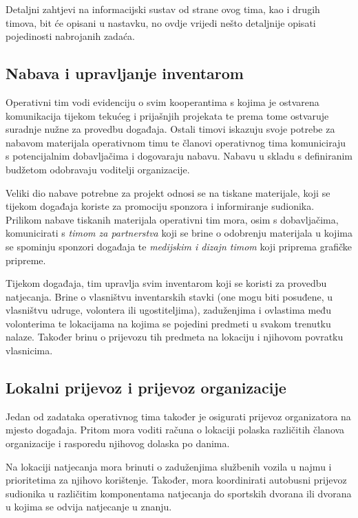 \documentclass[times, utf8, diplomski]{fer}
\begin{document}
Detaljni zahtjevi na informacijski sustav od strane ovog tima, kao i drugih
timova, bit će opisani u nastavku, no ovdje vrijedi nešto detaljnije opisati
pojedinosti nabrojanih zadaća.

\subsection{Nabava i upravljanje inventarom}
Operativni tim vodi evidenciju o svim kooperantima s kojima je ostvarena
komunikacija tijekom tekućeg i prijašnjih projekata te prema tome ostvaruje
suradnje nužne za provedbu događaja. Ostali timovi iskazuju svoje potrebe za
nabavom materijala operativnom timu te članovi operativnog tima komuniciraju s
potencijalnim dobavljačima i dogovaraju nabavu. Nabavu u skladu s definiranim
budžetom odobravaju voditelji organizacije.

Veliki dio nabave potrebne za projekt odnosi se na tiskane materijale, koji se
tijekom događaja koriste za promociju sponzora i informiranje sudionika.
Prilikom nabave tiskanih materijala operativni tim mora, osim s dobavljačima,
komunicirati s \emph{timom za partnerstva} koji se brine o odobrenju materijala u
kojima se spominju sponzori događaja te \emph{medijskim i dizajn timom} koji
priprema grafičke pripreme.

Tijekom događaja, tim upravlja svim inventarom koji se koristi za provedbu
natjecanja. Brine o vlasništvu inventarskih stavki (one mogu biti posuđene, u
vlasništvu udruge, volontera ili ugostiteljima), zaduženjima i ovlastima među
volonterima te lokacijama na kojima se pojedini predmeti u svakom trenutku
nalaze. Također brinu o prijevozu tih predmeta na lokaciju i njihovom povratku
vlasnicima.

\subsection{Lokalni prijevoz i prijevoz organizacije}

Jedan od zadataka operativnog tima također je osigurati prijevoz organizatora na
mjesto događaja. Pritom mora voditi računa o lokaciji polaska različitih članova
organizacije i rasporedu njihovog dolaska po danima.

Na lokaciji natjecanja mora brinuti o zaduženjima službenih vozila u najmu i
prioritetima za njihovo korištenje. Također, mora koordinirati autobusni
prijevoz sudionika u različitim komponentama natjecanja do sportskih dvorana ili
dvorana u kojima se odvija natjecanje u znanju.
\end{document}
